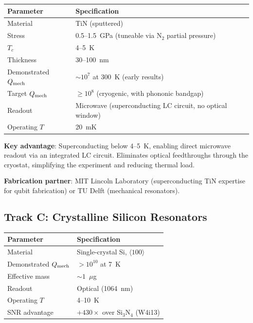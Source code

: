 \documentclass[11pt]{article}
\newcommand{\Qmech}{Q_{\rm mech}}
\begin{document}
\begin{center}
\renewcommand{\arraystretch}{1.2}
\begin{tabular}{@{}ll@{}}
\toprule
\textbf{Parameter} & \textbf{Specification} \\
\midrule
Material & TiN (sputtered) \\
Stress & 0.5--1.5~GPa (tuneable via N$_2$ partial pressure) \\
$T_c$ & 4--5~K \\
Thickness & 30--100~nm \\
Demonstrated $\Qmech$ & $\sim 10^7$ at 300~K (early results) \\
Target $\Qmech$ & $\geq 10^8$ (cryogenic, with phononic bandgap) \\
Readout & Microwave (superconducting LC circuit, no optical window) \\
Operating $T$ & 20~mK \\
\bottomrule
\end{tabular}
\end{center}

\textbf{Key advantage}: Superconducting below 4--5~K, enabling direct
microwave readout via an integrated LC circuit. Eliminates optical
feedthroughs through the cryostat, simplifying the experiment and
reducing thermal load.

\textbf{Fabrication partner}: MIT Lincoln Laboratory (superconducting
TiN expertise for qubit fabrication) or TU Delft (mechanical
resonators).

\subsection{Track C: Crystalline Silicon Resonators}

\begin{center}
\renewcommand{\arraystretch}{1.2}
\begin{tabular}{@{}ll@{}}
\toprule
\textbf{Parameter} & \textbf{Specification} \\
\midrule
Material & Single-crystal Si, $\langle 100\rangle$ \\
Demonstrated $\Qmech$ & $> 10^{10}$ at 7~K \\
Effective mass & $\sim 1$~$\mu$g \\
Readout & Optical (1064~nm) \\
Operating $T$ & 4--10~K \\
SNR advantage & $+430\times$ over Si$_3$N$_4$ (W4i13) \\
\bottomrule
\end{tabular}
\end{center}
\end{document}
